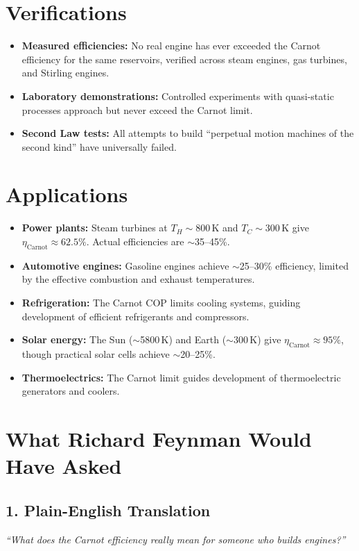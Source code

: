 \section*{Verifications}

\begin{itemize}
\item \textbf{Measured efficiencies:} No real engine has ever exceeded the Carnot efficiency for the same reservoirs, verified across steam engines, gas turbines, and Stirling engines.
\item \textbf{Laboratory demonstrations:} Controlled experiments with quasi-static processes approach but never exceed the Carnot limit.
\item \textbf{Second Law tests:} All attempts to build ``perpetual motion machines of the second kind'' have universally failed.
\end{itemize}
\section*{Applications}

\begin{itemize}
\item \textbf{Power plants:} Steam turbines at $T_H \sim 800$\,K and $T_C \sim 300$\,K give $\eta_{\text{Carnot}} \approx 62.5\%$. Actual efficiencies are $\sim$35--45\%.
\item \textbf{Automotive engines:} Gasoline engines achieve $\sim$25--30\% efficiency, limited by the effective combustion and exhaust temperatures.
\item \textbf{Refrigeration:} The Carnot COP limits cooling systems, guiding development of efficient refrigerants and compressors.
\item \textbf{Solar energy:} The Sun ($\sim$5800\,K) and Earth ($\sim$300\,K) give $\eta_{\text{Carnot}} \approx 95\%$, though practical solar cells achieve $\sim$20--25\%.
\item \textbf{Thermoelectrics:} The Carnot limit guides development of thermoelectric generators and coolers.
\end{itemize}
\section*{What Richard Feynman Would Have Asked}

\subsection*{1. Plain-English Translation}
\textit{``What does the Carnot efficiency really mean for someone who builds engines?''}

